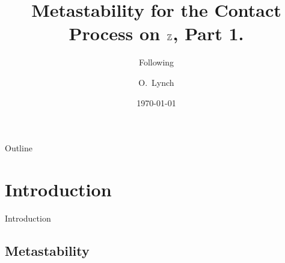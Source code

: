 \documentclass{beamer}
\title{Metastability for the Contact Process on $\mathbb{Z}$, Part 1.}
\subtitle{Following \cite{schonmann_metastability_1985}}
\author{O.~Lynch\inst{1}}
\institute[Universiteit Utrecht]
{
  \inst{1}%
  Department of Mathematics \\
  Universiteit Utrecht
}
\date{\today}
\begin{document}
\begin{frame}
  \titlepage
\end{frame}

\begin{frame}{Outline}
  \tableofcontents
\end{frame}

\section{Introduction}

\begin{frame}{Introduction}
  \tableofcontents[currentsection]
\end{frame}

\subsection{Metastability}
\end{document}
